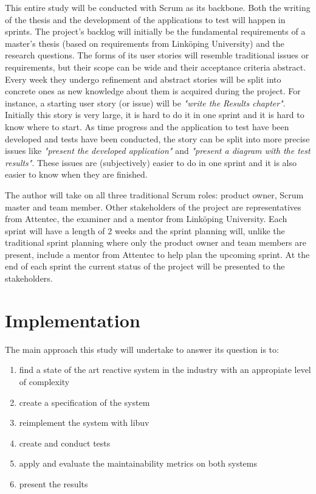 This entire study will be conducted with Scrum as its backbone. Both the
writing of the thesis and the development of the applications to test will
happen in sprints. The project's backlog will initially be the fundamental
requirements of a master's thesis (based on requirements from Linköping
University) and the research questions. The forms of its user stories will
resemble traditional issues or requirements, but their scope can be wide and
their acceptance criteria abstract. Every week they undergo refinement and
abstract stories will be split into concrete ones as new knowledge about them
is acquired during the project. For instance, a starting user story (or issue)
will be \textit{"write the Results chapter"}. Initially this story is very
large, it is hard to do it in one sprint and it is hard to know where to start.
As time progress and the application to test have been developed and tests have
been conducted, the story can be split into more precise issues like
\textit{"present the developed application"} and \textit{"present a diagram
with the test results"}. These issues are (subjectively) easier to do in one
sprint and it is also easier to know when they are finished.

The author will take on all three traditional Scrum roles: product owner, Scrum
master and team member. Other stakeholders of the project are representatives
from Attentec, the examiner and a mentor from Linköping University. Each sprint
will have a length of 2 weeks and the sprint planning will, unlike the
traditional sprint planning \cite{sims2012scrum} where only the product owner
and team members are present, include a mentor from Attentec to help plan the
upcoming sprint. At the end of each sprint the current status of the project
will be presented to the stakeholders.

\section{Implementation}

The main approach this study will undertake to answer its question is to:

\begin{enumerate}
  \item find a state of the art reactive system in the industry with an
    appropiate level of complexity
  \item create a specification of the system
  \item reimplement the system with libuv
  \item create and conduct tests
  \item apply and evaluate the maintainability metrics on both systems
  \item present the results
\end{enumerate}

